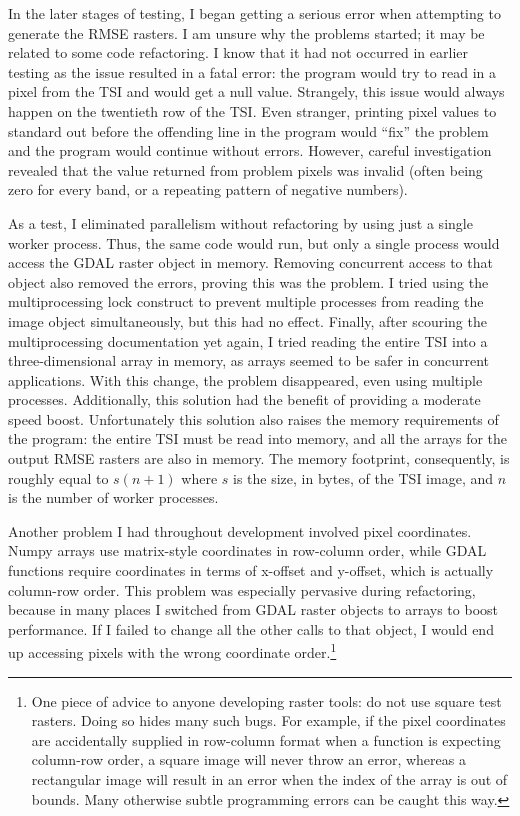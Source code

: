 In the later stages of testing, I began getting a serious error when attempting to generate the RMSE rasters. I am unsure why the problems started; it may be related to some code refactoring. I know that it had not occurred in earlier testing as the issue resulted in a fatal error: the program would try to read in a pixel from the TSI and would get a null value. Strangely, this issue would always happen on the twentieth row of the TSI. Even stranger, printing pixel values to standard out before the offending line in the program would ``fix'' the problem and the program would continue without errors. However, careful investigation revealed that the value returned from problem pixels was invalid (often being zero for every band, or a repeating pattern of negative numbers).

As a test, I eliminated parallelism without refactoring by using just a single worker process. Thus, the same code would run, but only a single process would access the GDAL raster object in memory. Removing  concurrent access to that object also removed the errors, proving this was the problem. I tried using the multiprocessing lock construct to prevent multiple processes from reading the image object simultaneously, but this had no effect. Finally, after scouring the multiprocessing documentation yet again, I tried reading the entire TSI into a three-dimensional array in memory, as arrays seemed to be safer in concurrent applications. With this change, the problem disappeared, even using multiple processes. Additionally, this solution had the benefit of providing a moderate speed boost. Unfortunately this solution also raises the memory requirements of the program: the entire TSI must be read into memory, and all the arrays for the output RMSE rasters are also in memory. The memory footprint, consequently, is roughly equal to $s(n + 1)$ where $s$ is the size, in bytes, of the TSI image, and $n$ is the number of worker processes.

Another problem I had throughout development involved pixel coordinates. Numpy arrays use matrix-style coordinates in row-column order, while GDAL functions require coordinates in terms of x-offset and y-offset, which is actually column-row order. This problem was especially pervasive during refactoring, because in many places I switched from GDAL raster objects to arrays to boost performance. If I failed to change all the other calls to that object, I would end up accessing pixels with the wrong coordinate order.\footnote{One piece of advice to anyone developing raster tools: do not use square test rasters. Doing so hides many such bugs. For example, if the pixel coordinates are accidentally supplied in row-column format when a function is expecting column-row order, a square image will never throw an error, whereas a rectangular image will result in an error when the index of the array is out of bounds. Many otherwise subtle programming errors can be caught this way.}

